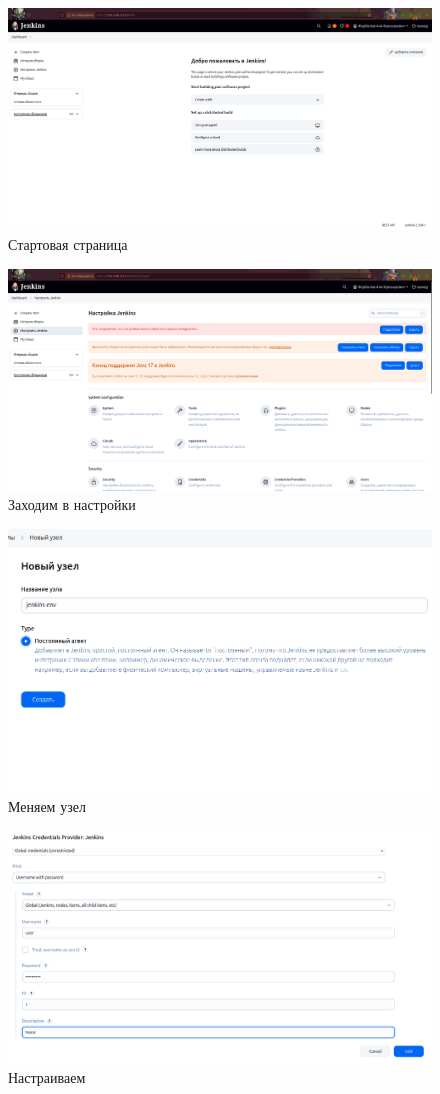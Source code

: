 


\pdfcrop




\begin{figure}[h!]
    \centering
    \includegraphics[width=0.5\linewidth]{pic/1.png}
    \caption{Стартовая страница}
    \label{fig:enter-label}
\end{figure}
\begin{figure}[h!]
    \centering
    \includegraphics[width=0.5\linewidth]{pic/2.png}
    \caption{Заходим в настройки}
    \label{fig:enter-label}
\end{figure}

\begin{figure}[h!]
    \centering
    \includegraphics[width=0.5\linewidth]{pic/3.png}
    \caption{Меняем узел}
    \label{fig:enter-label}
\end{figure}

\begin{figure}[h!]
    \centering
    \includegraphics[width=0.5\linewidth]{pic/4.png}
    \caption{Настраиваем}
    \label{fig:enter-label}
\end{figure}

